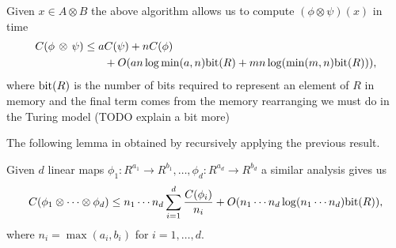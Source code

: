Given $x \in A \otimes B$ the above algorithm allows us to compute $(\phi \otimes \psi) (x)$ in time
\begin{align*}
    C(\phi \,\otimes\, \psi) \leq a&C(\psi) + nC(\phi)\\
                                   &+ O(a n \log \min(a, n) \textrm{bit}(R) + m n \log( \min (m, n)\textrm{bit}(R))),
\end{align*}
where $\textrm{bit}(R)$ is the number of bits required to represent an element of $R$ in memory and the final term comes from the memory rearranging we must do in the Turing model (TODO explain a bit more)

The following lemma in obtained by recursively applying the previous result.

\begin{lemma}\label{lem:multi-dim-dft}
    Given $d$ linear maps $\phi_1: R^{a_1} \to R^{b_1}, \ldots, \phi_d: R^{a_d} \to R^{b_d}$ a similar analysis gives us
    \[
        C(\phi_1 \otimes \cdots \otimes \phi_d) \leq n_1\cdots n_d \sum^d_{i = 1} \frac{C(\phi_i)}{n_i} + O(n_1\cdots n_d \log (n_1 \cdots n_d) \textrm{bit}(R)),
    \]
    where $n_i = \max(a_i, b_i)$ for $i = 1, \ldots, d$.
\end{lemma}



